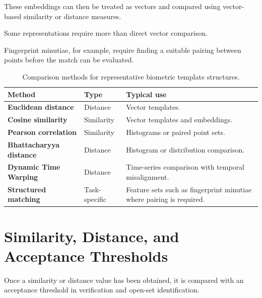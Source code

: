 \documentclass[11pt,a4paper,oneside]{report}
\begin{document}
These embeddings can then be treated as vectors and compared using
vector-based similarity or distance measures.

Some representations require more than direct vector comparison.

Fingerprint minutiae, for example, require finding a suitable pairing
between points before the match can be evaluated.

\begin{table}[htbp]
\centering
\caption{Comparison methods for representative biometric template structures.}
\label{tab:comparison-methods}
\small

\begin{tabular}{
    >{\bfseries}P{3.4cm}
    P{2.6cm}
    P{7.8cm}
}
\toprule

Method &
\textbf{Type} &
\textbf{Typical use}
\\

\midrule

Euclidean distance &
Distance &
Vector templates.
\\

Cosine similarity &
Similarity &
Vector templates and embeddings.
\\

Pearson correlation &
Similarity &
Histograms or paired point sets.
\\

Bhattacharyya distance &
Distance &
Histogram or distribution comparison.
\\

Dynamic Time Warping &
Distance &
Time-series comparison with temporal misalignment.
\\

Structured matching &
Task-specific &
Feature sets such as fingerprint minutiae where pairing is required.
\\

\bottomrule
\end{tabular}

\end{table}

\section{Similarity, Distance, and Acceptance Thresholds}
\label{subsec:thresholds}

Once a similarity or distance value has been obtained, it is compared
with an acceptance threshold in verification and open-set identification.
\end{document}
